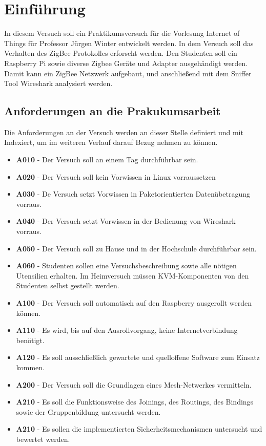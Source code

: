 \chapter{Einführung}

In diesem Versuch soll ein Praktikumsversuch für die Vorlesung Internet of Things für Professor Jürgen Winter 
entwickelt werden. In dem Versuch soll das Verhalten des ZigBee Protokolles erforscht werden. Den Studenten soll
ein Raspberry Pi sowie diverse Zigbee Geräte und Adapter ausgehändigt werden. Damit kann ein ZigBee Netzwerk aufgebaut,
und anschließend mit dem Sniffer Tool Wireshark analysiert werden.

\section{Anforderungen an die Prakukumsarbeit}

Die Anforderungen an der Versuch werden an dieser Stelle definiert und mit Indexiert, um im weiteren Verlauf 
darauf Bezug nehmen zu können.
\begin{itemize}
    \item \textbf{A010} - Der Versuch soll an einem Tag durchführbar sein.
    \item \textbf{A020} - Der Versuch soll kein Vorwissen in Linux vorraussetzen
    \item \textbf{A030} - De Versuch setzt Vorwissen in Paketorientierten Datenübetragung vorraus.
    \item \textbf{A040} - Der Versuch setzt Vorwissen in der Bedienung von Wireshark vorraus.
    \item \textbf{A050} - Der Versuch soll zu Hause und in der Hochschule durchführbar sein.
    \item \textbf{A060} - Studenten sollen eine Versuchsbeschreibung sowie alle nötigen Utensilien erhalten. Im Heimversuch müssen KVM-Komponenten von den Studenten selbst gestellt werden.
    \item \textbf{A100} - Der Versuch soll automatisch auf den Raspberry ausgerollt werden können.
    \item \textbf{A110} - Es wird, bis auf den Ausrollvorgang, keine Internetverbindung benötigt.
    \item \textbf{A120} - Es soll ausschließlich gewartete und quelloffene Software zum Einsatz kommen.
    \item \textbf{A200} - Der Versuch soll die Grundlagen eines Mesh-Netwerkes vermitteln.
    \item \textbf{A210} - Es soll die Funktionsweise des Joinings, des Routings, des Bindings sowie der Gruppenbildung untersucht werden.
    \item \textbf{A210} - Es sollen die implementierten Sicherheitsmechanismen untersucht und bewertet werden.
\end{itemize}

